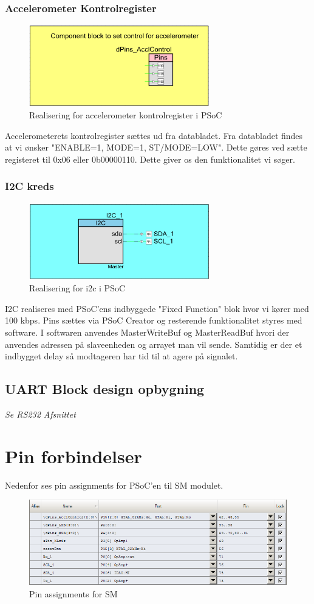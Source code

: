 \subsubsection{Accelerometer Kontrolregister}
\begin{figure}[H]
\centering
\includegraphics[width=0.7\textwidth]{billeder/Kontrolpsoc}
\caption{Realisering for accelerometer kontrolregister i PSoC}
\label{fig:SMAccReg}
\end{figure}
Accelerometerets kontrolregister sættes ud fra databladet. Fra databladet findes at vi ønsker "ENABLE=1, MODE=1, ST/MODE=LOW". Dette gøres ved sætte registeret til 0x06 eller 0b00000110. Dette giver os den funktionalitet vi søger.
\subsubsection{I2C kreds}
\begin{figure}[H]
\centering
\includegraphics[width=0.7\textwidth]{billeder/i2cpsoc}
\caption{Realisering for i2c i PSoC}
\label{fig:SMi2c}
\end{figure}
I2C realiseres med PSoC'ens indbyggede "Fixed Function" blok hvor vi kører med 100 kbps. Pins sættes via PSoC Creator og resterende funktionalitet styres med software. I softwaren anvendes MasterWriteBuf og MasterReadBuf hvori der anvendes adressen på slaveenheden og arrayet man vil sende. Samtidig er der et indbygget delay så modtageren har tid til at agere på signalet. 
\subsection{UART Block design opbygning}
\textit{Se RS232 Afsnittet}
\section{Pin forbindelser}
Nedenfor ses pin assignments for PSoC'en til SM modulet.
\begin{figure}[H]
\centering
\includegraphics[width=1\textwidth]{billeder/pinassignments}
\caption{Pin assignments for SM}
\label{fig:SMpin}
\end{figure}